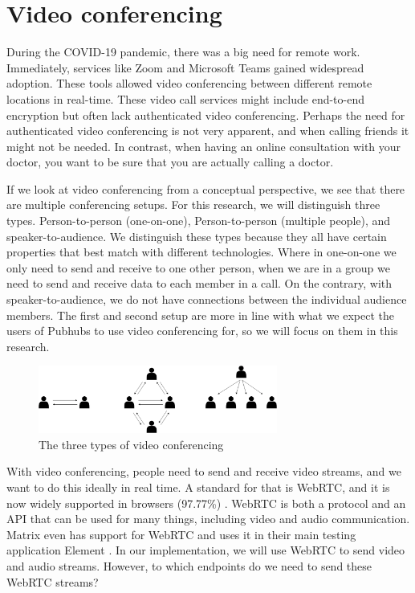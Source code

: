 \documentclass{report}
\begin{document}
\section{Video conferencing}
During the COVID-19 pandemic, there was a big need for remote work. Immediately, services like Zoom \cite{Zoom}  and Microsoft Teams  \cite{MSTeams} gained widespread adoption. These tools allowed video conferencing between different remote locations in real-time. These video call services might include end-to-end encryption but often lack authenticated video conferencing. Perhaps the need for authenticated video conferencing is not very apparent, and when calling friends it might not be needed. In contrast, when having an online consultation with your doctor, you want to be sure that you are actually calling a doctor.


If we look at video conferencing from a conceptual perspective, we see that there are multiple conferencing setups. For this research, we will distinguish three types. Person-to-person (one-on-one), Person-to-person (multiple people), and speaker-to-audience. We distinguish these types because they all have certain properties that best match with different technologies. Where in one-on-one we only need to send and receive to one other person, when we are in a group we need to send and receive data to each member in a call. On the contrary, with speaker-to-audience, we do not have connections between the individual audience members. The first and second setup are more in line with what we expect the users of Pubhubs to use video conferencing for, so we will focus on them in this research. 

\begin{figure}[!hbt]
    \centering
    \includegraphics[width=0.7\textwidth]{Research proposal/img/three types.drawio.png}
    \caption{The three types of video conferencing}
    \label{fig:enter-label}
\end{figure}

With video conferencing, people need to send and receive video streams, and we want to do this ideally in real time. A standard for that is WebRTC, and it is now widely supported in browsers (97.77\%) \cite{CIUIWEBRTC}. WebRTC is both a protocol and an API that can be used for many things, including video and audio communication. Matrix even has support for WebRTC and uses it in their main testing application Element \cite{ELEMENT}. In our implementation, we will use WebRTC to send video and audio streams. However, to which endpoints do we need to send these WebRTC streams?
\end{document}
